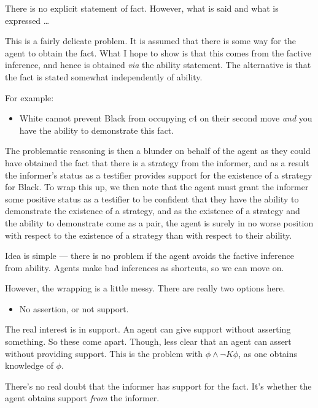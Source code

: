 \documentclass[10pt]{article}
\begin{document}
\begin{note}[Embedded]
  There is no explicit statement of fact.
  However, what is said and what is expressed \dots

  This is a fairly delicate problem.
  It is assumed that there is some way for the agent to obtain the fact.
  What I hope to show is that this comes from the factive inference, and hence is obtained \emph{via} the ability statement.
  The alternative is that the fact is stated somewhat independently of ability.

  For example:
  \begin{itemize}
  \item White cannot prevent Black from occupying c4 on their second move \emph{and} you have the ability to demonstrate this fact.
  \end{itemize}

  The problematic reasoning is then a blunder on behalf of the agent as they could have obtained the fact that there is a strategy from the informer, and as a result the informer's status as a testifier provides support for the existence of a strategy for Black.
  To wrap this up, we then note that the agent must grant the informer some positive status as a testifier to be confident that they have the ability to demonstrate the existence of a strategy, and as the existence of a strategy and the ability to demonstrate come as a pair, the agent is surely in no worse position with respect to the existence of a strategy than with respect to their ability.

  Idea is simple --- there is no problem if the agent avoids the factive inference from ability.
  Agents make bad inferences as shortcuts, so we can move on.

  However, the wrapping is a little messy.
  There are really two options here.
  \begin{itemize}
  \item No assertion, or not support.
  \end{itemize}

  The real interest is in support.
  An agent can give support without asserting something.
  So these come apart.
  Though, less clear that an agent can assert without providing support.
  This is the problem with \(\phi \land \lnot K \phi\), as one obtains knowledge of \(\phi\).

  There's no real doubt that the informer has support for the fact.
  It's whether the agent obtains support \emph{from} the informer.


\end{note}
\end{document}
